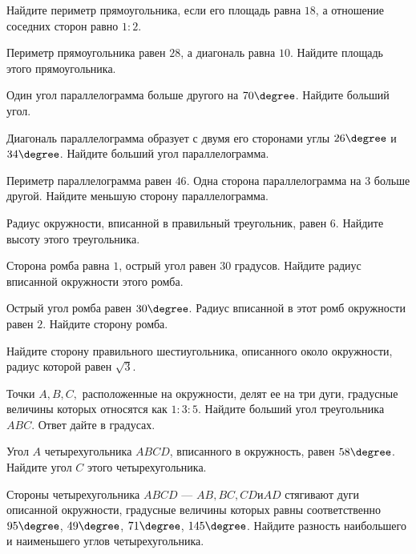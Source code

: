 \begin{class}[number=8]
\begin{listofex}
		\item Найдите периметр прямоугольника, если его площадь равна \(18\), а отношение соседних сторон равно \(1:2\).
		\item Периметр прямоугольника равен \(28\), а диагональ равна \(10\). Найдите площадь этого прямоугольника.
		\item Один угол параллелограмма больше другого на \(70 \degree \). Найдите больший угол.
		\item Диагональ параллелограмма образует с двумя его сторонами углы \(26\degree\) и \(34\degree \). Найдите больший угол параллелограмма.
		\item Периметр параллелограмма равен \(46\). Одна сторона параллелограмма на \(3\) больше другой. Найдите меньшую сторону параллелограмма.
		\item Радиус окружности, вписанной в правильный треугольник, равен \(6\). Найдите высоту этого треугольника.
		\item Сторона ромба равна \(1\), острый угол равен \(30\) градусов. Найдите радиус вписанной окружности этого ромба.
		\item Острый угол ромба равен \(30\degree \). Радиус вписанной в этот ромб окружности равен \(2\). Найдите сторону ромба.
		\item Найдите сторону правильного шестиугольника, описанного около окружности, радиус которой равен \(\sqrt{3}\).
		\item Точки \(A, B, C,\) расположенные на окружности, делят ее на три дуги, градусные величины которых относятся как \(1 : 3 : 5\). Найдите больший угол треугольника \(ABC\). Ответ дайте в градусах.
		\item Угол \(A\) четырехугольника \(ABCD\), вписанного в окружность, равен \(58 \degree \). Найдите угол \(C\) этого четырехугольника.
		\item Стороны четырехугольника \(ABCD\) --- \(AB, BC, CD и AD\) стягивают дуги описанной окружности, градусные величины которых равны соответственно \(95\degree \), \(49\degree\), \(71\degree\), \(145\degree\). Найдите разность наибольшего и наименьшего углов четырехугольника.
	\end{listofex}
\end{class}
